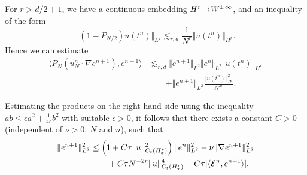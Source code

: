 \documentclass[reqno,a4paper]{amsart}
\begin{document}
For $r>d/2+1$, we have a continuous embedding $H^r {\hookrightarrow} W^{1,\infty}$, and an inequality of the form
\[
\Vert (1-P_{N/2}) u(t^n) \Vert_{L^2}
\lesssim_{r,d}
\frac{1}{N^{r}} \Vert u(t^n) \Vert_{H^r}.
\]
Hence we can estimate 
\begin{align*}
\langle P_N(u^n_N \cdot \nabla e^{n+1}), e^{n+1} \rangle
&\lesssim_{r,d}
\Vert e^{n+1} \Vert_{L^2} \Vert e^n \Vert_{L^2} \Vert u(t^n) \Vert_{H^r}
\\
&\qquad
+ \Vert e^{n+1} \Vert_{L^2} \frac{\Vert u(t^n) \Vert_{H^r}^2}{N^{2r}} .
\end{align*}


Estimating the products on the right-hand side using the inequality $ab \le \epsilon a^2 + \frac1{4\epsilon} b^2$ with suitable $\epsilon > 0$, it follows that there exists a constant $C>0$ (independent of $\nu>0$, $N$ and $n$), such that
\begin{gather} \label{eq:est0}
\begin{aligned} 
\Vert e^{n+1} \Vert^2_{L^2}
&\le
\left(
1
+
C {\tau} \Vert u \Vert_{C_t(H^{r}_x)}^2
\right)
\Vert e^n \Vert^2 _{L^2}
-
\nu \Vert \nabla e^{n+1} \Vert_{L^2}^2
\\
&\qquad + 
C{\tau} N^{-2r} \Vert u \Vert_{C_t(H^r_x)}^4
+
C {\tau} |\langle \mathcal{E}^n, e^{n+1} \rangle|.
\end{aligned}
\end{gather}
\end{document}
